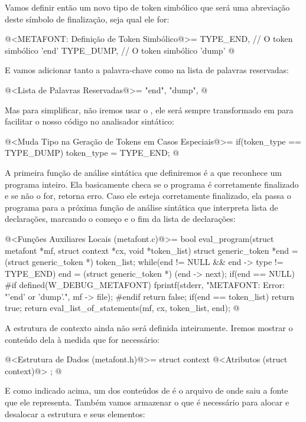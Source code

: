 Vamos definir então um novo tipo de token simbólico que será uma
abreviação deste símbolo de finalização, seja qual ele for:

\iniciocodigo
@<METAFONT: Definição de Token Simbólico@>=
TYPE_END,  // O token simbólico 'end'
TYPE_DUMP, // O token simbólico 'dump'
@
\fimcodigo

E vamos adicionar tanto a palavra-chave 
como  na lista de palavras reservadas:

\iniciocodigo
@<Lista de Palavras Reservadas@>=
"end", "dump",
@
\fimcodigo

Mas para simplificar, não iremos usar o , ele
será sempre transformado em  para facilitar o
nosso código no analisador sintático:

\iniciocodigo
@<Muda Tipo na Geração de Tokens em Casos Especiais@>=
if(token_type == TYPE_DUMP)
  token_type = TYPE_END;
@
\fimcodigo

A primeira função de análise sintática que definiremos é a que
reconhece um programa inteiro. Ela basicamente checa se o programa é
corretamente finalizado e se não o for, retorna erro. Caso ele esteja
corretamente finalizado, ela passa o programa para a próxima função de
análise sintática que interpreta lista de declarações, marcando o
começo e o fim da lista de declarações:

\iniciocodigo
@<Funções Auxiliares Locais (metafont.c)@>=
bool eval_program(struct metafont *mf, struct context *cx,
                  void *token_list){
  struct generic_token *end = (struct generic_token *) token_list;
  while(end != NULL && end -> type != TYPE_END)
    end = (struct generic_token *) (end -> next);
  if(end == NULL){
#if defined(W_DEBUG_METAFONT)
    fprintf(stderr, "METAFONT: Error: %
                    "'end' or 'dump'.\n", mf -> file);
#endif
    return false;
  }
  if(end == token_list)
    return true;
  return eval_list_of_statements(mf, cx, token_list, end);
}
@
\fimcodigo

A estrutura de contexto ainda não será definida inteiramente. Iremos
mostrar o conteúdo dela à medida que for necessário:

\iniciocodigo
@<Estrutura de Dados (metafont.h)@>=
struct context{
  @<Atributos (struct context)@>
};
@
\fimcodigo

E como indicado acima, um dos conteúdos de  é o arquivo de onde saiu a fonte que ele representa. Também
vamos armazenar o que é necessário para alocar e desalocar a estrutura
e seus elementos:

